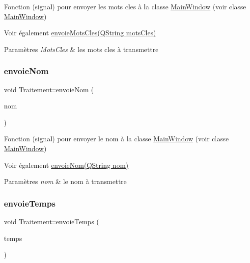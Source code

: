 Fonction (signal) pour envoyer les mots cles à la classe \hyperlink{classMainWindow}{Main\+Window} (voir classe \hyperlink{classMainWindow}{Main\+Window}) 

\begin{DoxySeeAlso}{Voir également}
\hyperlink{classTraitement_ac54c2833459c0fb24b0c15d589d05ef5}{envoie\+Mots\+Cles(\+Q\+String mots\+Cles)} 
\end{DoxySeeAlso}

\begin{DoxyParams}{Paramètres}
{\em Mots\+Cles} & les mots cles à transmettre \\
\hline
\end{DoxyParams}
\mbox{\label{classTraitement_a9f84743a77b0074f209eda21d32ee95b}} 
\subsubsection{\texorpdfstring{envoie\+Nom}{envoieNom}}
{\footnotesize\ttfamily void Traitement\+::envoie\+Nom (\begin{DoxyParamCaption}\item[{Q\+String}]{nom }\end{DoxyParamCaption})\hspace{0.3cm}{\ttfamily [signal]}}



Fonction (signal) pour envoyer le nom à la classe \hyperlink{classMainWindow}{Main\+Window} (voir classe \hyperlink{classMainWindow}{Main\+Window}) 

\begin{DoxySeeAlso}{Voir également}
\hyperlink{classTraitement_a9f84743a77b0074f209eda21d32ee95b}{envoie\+Nom(\+Q\+String nom)} 
\end{DoxySeeAlso}

\begin{DoxyParams}{Paramètres}
{\em nom} & le nom à transmettre \\
\hline
\end{DoxyParams}
\mbox{\label{classTraitement_ab8dfd067d627e71a4abb42aaf7874115}} 
\subsubsection{\texorpdfstring{envoie\+Temps}{envoieTemps}}
{\footnotesize\ttfamily void Traitement\+::envoie\+Temps (\begin{DoxyParamCaption}\item[{Q\+String}]{temps }\end{DoxyParamCaption})\hspace{0.3cm}{\ttfamily [signal]}}



